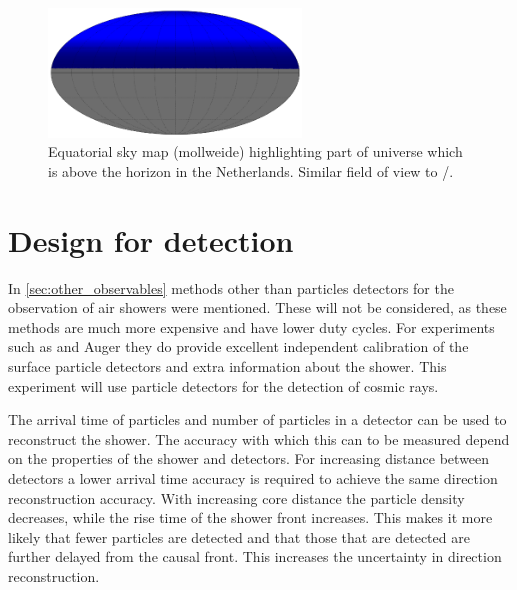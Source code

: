 \begin{figure}
    \centering
    \includegraphics[width=0.6\textwidth]
                    {plots/cosmic-rays/visible_sky_map.png}
    \caption{Equatorial sky map (mollweide) highlighting part of universe which is above the horizon in the Netherlands. Similar field of view to \ta/\kascade.}
    \label{fig:visible_sky_map}
\end{figure}


\section{Design for detection}

In \cref{sec:other_observables} methods other than particles detectors for the observation of air showers were mentioned. These will not be considered, as these methods are much more expensive and have lower duty cycles. For experiments such as \ta and Auger they do provide excellent independent calibration of the surface particle detectors and extra information about the shower. This experiment will use particle detectors for the detection of cosmic rays.

The arrival time of particles and number of particles in a detector can be used to reconstruct the shower. The accuracy with which this can to be measured depend on the properties of the shower and detectors. For increasing distance between detectors a lower arrival time accuracy is required to achieve the same direction reconstruction accuracy. With increasing core distance the particle density decreases, while the rise time of the shower front increases. This makes it more likely that fewer particles are detected and that those that are detected are further delayed from the causal front. This increases the uncertainty in direction reconstruction.

